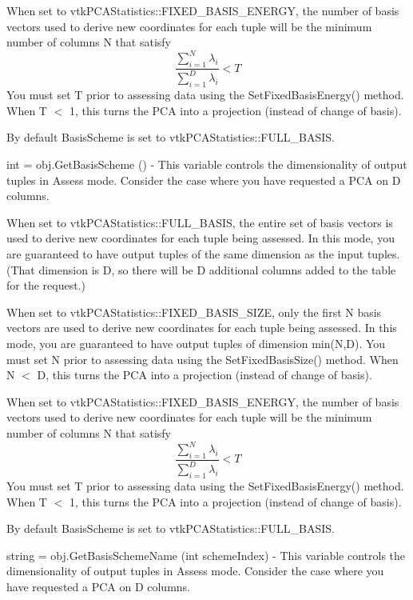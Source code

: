 \begin{DoxyItemize}
When set to vtk\-P\-C\-A\-Statistics\-::\-F\-I\-X\-E\-D\-\_\-\-B\-A\-S\-I\-S\-\_\-\-E\-N\-E\-R\-G\-Y, the number of basis vectors used to derive new coordinates for each tuple will be the minimum number of columns N that satisfy \[ \frac{\sum_{i=1}^{N} \lambda_i}{\sum_{i=1}^{D} \lambda_i} < T \] You must set T prior to assessing data using the Set\-Fixed\-Basis\-Energy() method. When T $<$ 1, this turns the P\-C\-A into a projection (instead of change of basis).

By default Basis\-Scheme is set to vtk\-P\-C\-A\-Statistics\-::\-F\-U\-L\-L\-\_\-\-B\-A\-S\-I\-S.  
\item {\ttfamily int = obj.\-Get\-Basis\-Scheme ()} -\/ This variable controls the dimensionality of output tuples in Assess mode. Consider the case where you have requested a P\-C\-A on D columns.

When set to vtk\-P\-C\-A\-Statistics\-::\-F\-U\-L\-L\-\_\-\-B\-A\-S\-I\-S, the entire set of basis vectors is used to derive new coordinates for each tuple being assessed. In this mode, you are guaranteed to have output tuples of the same dimension as the input tuples. (That dimension is D, so there will be D additional columns added to the table for the request.)

When set to vtk\-P\-C\-A\-Statistics\-::\-F\-I\-X\-E\-D\-\_\-\-B\-A\-S\-I\-S\-\_\-\-S\-I\-Z\-E, only the first N basis vectors are used to derive new coordinates for each tuple being assessed. In this mode, you are guaranteed to have output tuples of dimension min(\-N,\-D). You must set N prior to assessing data using the Set\-Fixed\-Basis\-Size() method. When N $<$ D, this turns the P\-C\-A into a projection (instead of change of basis).

When set to vtk\-P\-C\-A\-Statistics\-::\-F\-I\-X\-E\-D\-\_\-\-B\-A\-S\-I\-S\-\_\-\-E\-N\-E\-R\-G\-Y, the number of basis vectors used to derive new coordinates for each tuple will be the minimum number of columns N that satisfy \[ \frac{\sum_{i=1}^{N} \lambda_i}{\sum_{i=1}^{D} \lambda_i} < T \] You must set T prior to assessing data using the Set\-Fixed\-Basis\-Energy() method. When T $<$ 1, this turns the P\-C\-A into a projection (instead of change of basis).

By default Basis\-Scheme is set to vtk\-P\-C\-A\-Statistics\-::\-F\-U\-L\-L\-\_\-\-B\-A\-S\-I\-S.  
\item {\ttfamily string = obj.\-Get\-Basis\-Scheme\-Name (int scheme\-Index)} -\/ This variable controls the dimensionality of output tuples in Assess mode. Consider the case where you have requested a P\-C\-A on D columns.


\end{DoxyItemize}
